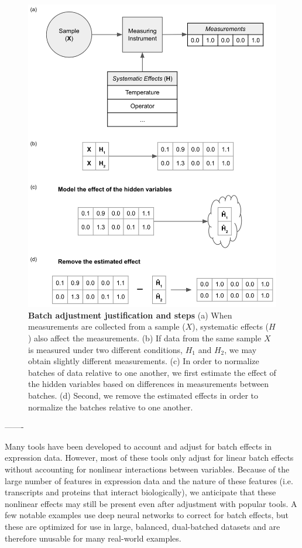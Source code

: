 \documentclass[notitlepage]{article}
\begin{document}
\begin{figure}
	\centering
	\includegraphics[width=4.5in]{figures/rough/adjuster_workflow}
	\caption{\textbf{Batch adjustment justification and steps}
	(a) When measurements are collected from a sample ($X$), systematic effects ($H$) also affect the measurements.
	(b) If data from the same sample $X$ is measured under two different conditions, $H_1$ and $H_2$, we may obtain slightly different measurements.
	(c) In order to normalize batches of data relative to one another, we first estimate the effect of the hidden variables based on differences in measurements between batches.
	(d) Second, we remove the estimated effects in order to normalize the batches relative to one another.}
	\label{fig:workflow}
\end{figure}

-------

Many tools have been developed to account and adjust for batch effects in expression data.
However, most of these tools only adjust for linear batch effects without accounting for nonlinear interactions between variables.
Because of the large number of features in expression data and the nature of these features (i.e. transcripts and proteins that interact biologically), we anticipate that these nonlinear effects may still be present even after adjustment with popular tools.
A few notable examples \cite{shaham_removal_2017,shaham_batch_2018} use deep neural networks to correct for batch effects, but these are optimized for use in large, balanced, dual-batched datasets and are therefore unusable for many real-world examples.
\end{document}
